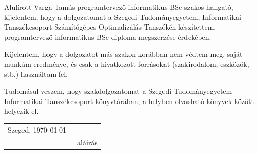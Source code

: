 \documentclass[12pt]{report}
\theoremstyle{definition}
\begin{document}
	
	
	\noindent
	Alulírott Varga Tamás programtervező informatikus BSc szakos hallgató, kijelentem, hogy a dolgozatomat a Szegedi Tudományegyetem, Informatikai Tanszékcsoport Számítógépes Optimalizálás Tanszékén készítettem, programtervező informatikus BSc diploma megszerzése érdekében.
	
	Kijelentem, hogy a dolgozatot más szakon korábban nem védtem meg, saját munkám eredménye, és csak a hivatkozott forrásokat (szakirodalom, eszközök, stb.) használtam fel.
	
	Tudomásul veszem, hogy szakdolgozatomat a Szegedi Tudományegyetem Informatikai Tanszékcsoport könyvtárában, a helyben olvasható könyvek között helyezik el.
	
	\vspace*{2cm}
	
	\begin{tabular}{lc}
		Szeged, \today\
		\hspace{2cm} & \makebox[6cm]{\dotfill} \\
		& aláírás \\
	\end{tabular}
	
	
	
	\vspace*{4cm}
	
	
	
	
	
\end{document}
